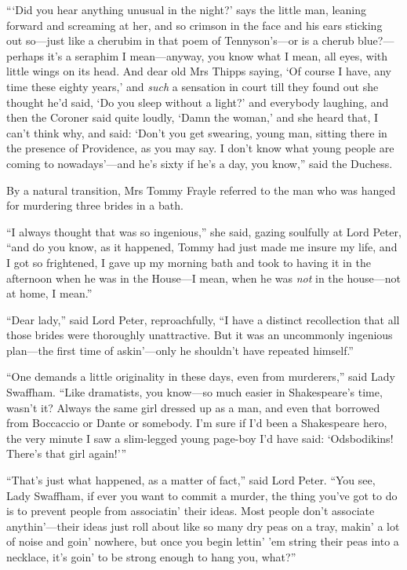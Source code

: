 \enquote{\enquote{Did you hear anything unusual in the night?} says the little man, leaning forward and screaming at her, and so crimson in the face and his ears sticking out so\allowbreak---\allowbreak just like a cherubim in that poem of Tennyson’s\allowbreak---\allowbreak or is a cherub blue?---perhaps it’s a seraphim I mean\allowbreak---\allowbreak anyway, you know what I mean, all eyes, with little wings on its head. And dear old Mrs Thipps saying, \enquote{Of course I have, any time these eighty years,} and \textit{such} a sensation in court till they found out she thought he’d said, \enquote{Do you sleep without a light?} and everybody laughing, and then the Coroner said quite loudly, \enquote{Damn the woman,} and she heard that, I can’t think why, and said: \enquote{Don’t you get swearing, young man, sitting there in the presence of Providence, as you may say. I don’t know what young people are coming to nowadays}---and he’s sixty if he’s a day, you know,} said the Duchess.

By a natural transition, Mrs Tommy Frayle referred to the man who was hanged for murdering three brides in a bath.

\enquote{I always thought that was so ingenious,} she said, gazing soulfully at Lord Peter, \enquote{and do you know, as it happened, Tommy had just made me insure my life, and I got so frightened, I gave up my morning bath and took to having it in the afternoon when he was in the House\allowbreak---\allowbreak I mean, when he was \textit{not} in the house\allowbreak---\allowbreak not at home, I mean.}

\enquote{Dear lady,} said Lord Peter, reproachfully, \enquote{I have a distinct recollection that all those brides were thoroughly unattractive. But it was an uncommonly ingenious plan\allowbreak---\allowbreak the first time of askin’---only he shouldn’t have repeated himself.}

\enquote{One demands a little originality in these days, even from murderers,} said Lady Swaffham. \enquote{Like dramatists, you know\allowbreak---\allowbreak so much easier in Shakespeare’s time, wasn’t it? Always the same girl dressed up as a man, and even that borrowed from Boccaccio or Dante or somebody. I’m sure if I’d been a Shakespeare hero, the very minute I saw a slim-legged young page-boy I’d have said: \enquote{Odsbodikins! There’s that girl again!}}

\enquote{That’s just what happened, as a matter of fact,} said Lord Peter. \enquote{You see, Lady Swaffham, if ever you want to commit a murder, the thing you’ve got to do is to prevent people from associatin’ their ideas. Most people don’t associate anythin’---their ideas just roll about like so many dry peas on a tray, makin’ a lot of noise and goin’ nowhere, but once you begin lettin’ ’em string their peas into a necklace, it’s goin’ to be strong enough to hang you, what?}

